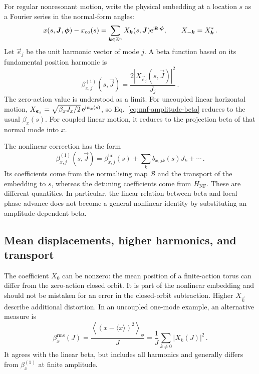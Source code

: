 For regular nonresonant motion, write the physical embedding at a location
$s$ as a Fourier series in the normal-form angles:
\begin{equation}\label{eq:nnf-torus-fourier}
    x(s,\bm{J},\bm{\phi})-x_{\mathrm{co}}(s) = \sum_{\bm{k}\in\mathbb Z^n}
    X_{\bm{k}}(s,\bm{J})\mathrm{e}^{\mathrm{i}\bm{k}\cdot\bm{\phi}},
    \qquad X_{-\bm{k}} = X_{\bm{k}}^*\,.
\end{equation}
Let $\vec e_j$ be the unit harmonic vector of mode $j$.  A beta function
based on its fundamental position harmonic is
\begin{equation}\label{eq:nnf-amplitude-beta}
    \beta_{x,j}^{(1)}(s,\vec J) = \frac{2|X_{\vec e_j}(s,\vec J)|^2}{J_j}\,.
\end{equation}
The zero-action value is understood as a limit.  For uncoupled linear
horizontal motion, $X_{\bm{e}_x} = \sqrt{\beta_xJ_x/2}\,
\mathrm{e}^{\mathrm{i}\psi_x(s)}$, so Eq.~\eqref{eq:nnf-amplitude-beta} reduces to the
usual $\beta_x(s)$.  For coupled linear motion, it reduces to the projection
beta of that normal mode into $x$.

The nonlinear correction has the form
\begin{equation}
    \beta_{x,j}^{(1)}(s,\vec J) = \beta_{x,j}^{\mathrm{lin}}(s) + \sum_k b_{x,jk}(s)J_k + \cdots\,.
\end{equation}
Its coefficients come from the normalising map $\mathcal B$ and the
transport of the embedding to $s$, whereas the detuning coefficients come
from $H_{\mathrm{NF}}$.  These are different quantities.  In particular,
the linear relation between beta and local phase advance does not become
a general nonlinear identity by substituting an amplitude-dependent beta.


\subsection{Mean displacements, higher harmonics, and transport}

The coefficient $X_0$ can be nonzero: the mean position of a finite-action
torus can differ from the zero-action closed orbit.  It is part of the
nonlinear embedding and should not be mistaken for an error in the
closed-orbit subtraction.  Higher $X_{\vec k}$ describe additional
distortion.  In an uncoupled one-mode example, an alternative measure is
\begin{equation}
    \beta_x^{\mathrm{rms}}(J) = \frac{\left\langle(x-\langle x\rangle)^2\right\rangle_\phi}{J} = \frac{1}{J}\sum_{k\ne0}|X_k(J)|^2\,.
\end{equation}
It agrees with the linear beta, but includes all harmonics and generally
differs from $\beta_x^{(1)}$ at finite amplitude.

